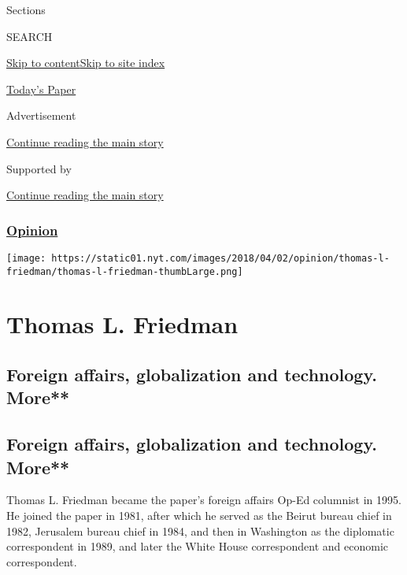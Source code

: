 Sections

SEARCH

\protect\hyperlink{site-content}{Skip to
content}\protect\hyperlink{site-index}{Skip to site index}

\href{https://myaccount.nytimes.com/auth/login?response_type=cookie\&client_id=vi}{}

\href{https://www.nytimes.com/section/todayspaper}{Today's Paper}

Advertisement

\protect\hyperlink{after-top}{Continue reading the main story}

Supported by

\protect\hyperlink{after-sponsor}{Continue reading the main story}

\hypertarget{opinion}{%
\subsubsection{\texorpdfstring{\href{/section/opinion}{Opinion}}{Opinion}}\label{opinion}}

\texttt{[image: https://static01.nyt.com/images/2018/04/02/opinion/thomas-l-friedman/thomas-l-friedman-thumbLarge.png]}

\hypertarget{thomas-l-friedman}{%
\section{Thomas L. Friedman}\label{thomas-l-friedman}}

\hypertarget{foreign-affairs-globalization-and-technology-more}{%
\subsection{Foreign affairs, globalization and technology.
More**}\label{foreign-affairs-globalization-and-technology-more}}

\hypertarget{foreign-affairs-globalization-and-technology-more-1}{%
\subsection{Foreign affairs, globalization and technology.
More**}\label{foreign-affairs-globalization-and-technology-more-1}}

Thomas L. Friedman became the paper's foreign affairs Op-Ed columnist in
1995. He joined the paper in 1981, after which he served as the Beirut
bureau chief in 1982, Jerusalem bureau chief in 1984, and then in
Washington as the diplomatic correspondent in 1989, and later the White
House correspondent and economic correspondent.

